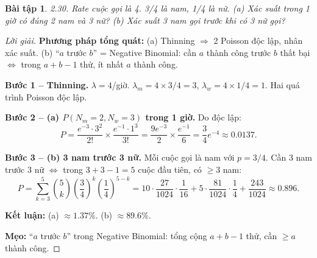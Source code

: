 \documentclass[8pt,a4paper]{article}
\newtheorem{exercise}{Bài tập}
\newenvironment{solution}{\begin{proof}[Lời giải]}{\end{proof}}
\begin{document}
\begin{exercise}
2.30. Rate cuộc gọi là 4. 3/4 là nam, 1/4 là nữ.
(a) Xác suất trong 1 giờ có đúng 2 nam và 3 nữ?
(b) Xác suất 3 nam gọi trước khi có 3 nữ gọi?
\end{exercise}
\begin{solution}
\textbf{Phương pháp tổng quát:} (a) Thinning $\Rightarrow$ 2 Poisson độc lập, nhân xác suất. (b) ``$a$ trước $b$'' = Negative Binomial: cần $a$ thành công trước $b$ thất bại $\Leftrightarrow$ trong $a+b-1$ thử, ít nhất $a$ thành công.

\textbf{Bước 1 -- Thinning.} $\lambda = 4$/giờ. $\lambda_m = 4 \times 3/4 = 3$, $\lambda_w = 4 \times 1/4 = 1$. Hai quá trình Poisson độc lập.

\textbf{Bước 2 -- (a) $P(N_m = 2, N_w = 3)$ trong 1 giờ.} Do độc lập:
\[
  P = \frac{e^{-3} \cdot 3^2}{2!} \times \frac{e^{-1} \cdot 1^3}{3!} = \frac{9e^{-3}}{2} \times \frac{e^{-1}}{6} = \frac{3}{4}e^{-4} \approx \boxed{0.0137}.
\]

\textbf{Bước 3 -- (b) 3 nam trước 3 nữ.} Mỗi cuộc gọi là nam với $p = 3/4$. Cần 3 nam trước 3 nữ $\Leftrightarrow$ trong $3+3-1 = 5$ cuộc đầu tiên, có $\geq 3$ nam:
\[
  P = \sum_{k=3}^{5} \binom{5}{k}\left(\frac{3}{4}\right)^k\left(\frac{1}{4}\right)^{5-k} = 10 \cdot \frac{27}{1024} \cdot \frac{1}{16} + 5 \cdot \frac{81}{1024} \cdot \frac{1}{4} + \frac{243}{1024} \approx \boxed{0.896}.
\]

\textbf{Kết luận:} (a) $\approx 1.37\%$. (b) $\approx 89.6\%$.

\textbf{Mẹo:} ``$a$ trước $b$'' trong Negative Binomial: tổng cộng $a+b-1$ thử, cần $\geq a$ thành công.
\end{solution}
\end{document}
